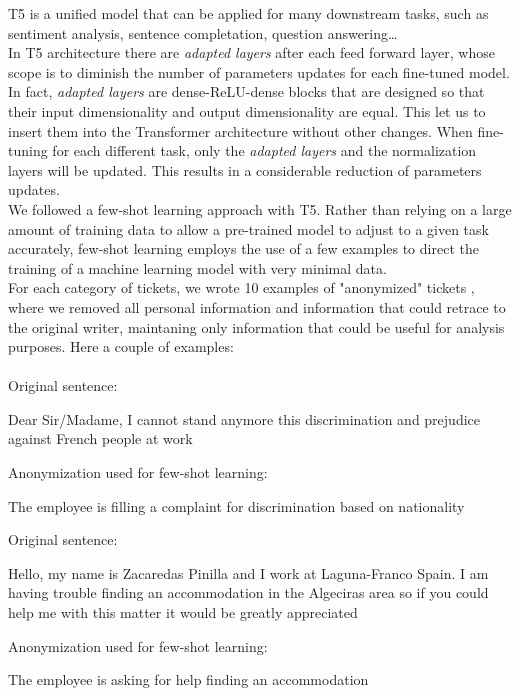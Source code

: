 T5 is a unified model that can be applied for many downstream tasks, such as sentiment analysis, sentence completation, question answering\dots\\
In T5 architecture there are \textit{adapted layers} after each feed forward layer, whose scope is to diminish the number of parameters updates for each fine-tuned model. In fact, \textit{adapted layers} are dense-ReLU-dense blocks that are designed so that their input dimensionality and output dimensionality are equal. This let us to insert them into the Transformer architecture without other changes. When fine-tuning for each different task, only the \textit{adapted layers} and the normalization layers will be updated. This results in a considerable reduction of parameters updates.\\
We followed a few-shot learning approach with T5. Rather than relying on a large amount of training data to allow a pre-trained model to adjust to a given task accurately, few-shot learning employs the use of a few examples to direct the training of a machine learning model with very minimal data. \\
For each category of tickets, we wrote 10 examples of "anonymized" tickets , where we removed all personal information and information that could retrace to the original writer, maintaning only information that could be useful for analysis purposes.
Here a couple of examples:\\ \\
Original sentence:
\begin{adjustwidth}{1cm}{}
    Dear Sir/Madame, I cannot stand anymore this discrimination and prejudice against French people at work
\end{adjustwidth}
Anonymization used for few-shot learning:
\begin{adjustwidth}{1cm}{}
    The employee is filling a complaint for discrimination based on nationality 
\end{adjustwidth}
Original sentence:
\begin{adjustwidth}{1cm}{}
    Hello, my name is Zacaredas Pinilla and I work at Laguna-Franco Spain. I am having trouble finding an accommodation in the Algeciras area so if you could help me with this matter it would be greatly appreciated
\end{adjustwidth}
Anonymization used for few-shot learning:
\begin{adjustwidth}{1cm}{}
    The employee is asking for help finding an accommodation
\end{adjustwidth}
